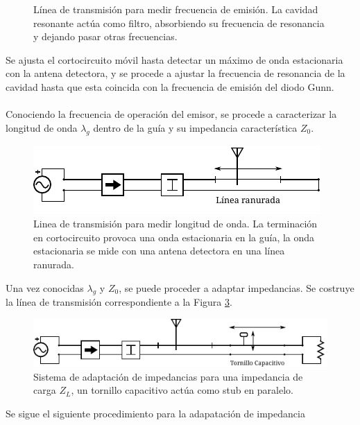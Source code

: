 \documentclass[11pt,a4paper]{article}
\begin{document}
\begin{multicols}{2}
\begin{figure}[H]
    \caption{Línea de transmisión para medir frecuencia de emisión. La cavidad resonante actúa como filtro, absorbiendo su frecuencia de resonancia y dejando pasar otras frecuencias.}
    \label{fig:arr1}
\end{figure}
Se ajusta el cortocircuito móvil hasta detectar un máximo de onda estacionaria con la antena detectora, y se procede a ajustar la frecuencia de resonancia de la cavidad hasta que esta coincida con la frecuencia de emisión del diodo Gunn.\\ \\
Conociendo la frecuencia de operación del emisor, se procede a caracterizar la longitud de onda $\lambda_g$ dentro de la guía y su impedancia característica $Z_0$. 
\begin{figure}[H]
    \centering
    \includegraphics[width=\linewidth]{Images/arreglo2.pdf}
    \caption{Linea de transmisión para medir longitud de onda. La terminación en cortocircuito provoca una onda estacionaria en la guía, la onda estacionaria se mide con una antena detectora en una línea ranurada.}
    \label{fig:arr2}
\end{figure}

Una vez conocidas $\lambda_g$ y $Z_0$, se puede proceder a adaptar impedancias. Se costruye la línea de transmisión correspondiente a la Figura \ref{fig:arr4}.

\begin{figure}[H]
    \centering
    \includegraphics[width=\linewidth]{Images/arreglo4.pdf}
    \caption{Sistema de adaptación de impedancias para una impedancia de carga $Z_L$, un tornillo capacitivo actúa como stub en paralelo.}
    \label{fig:arr4}
\end{figure}

Se sigue el siguiente procedimiento para la adapatación de impedancia


\end{multicols}
\end{document}
